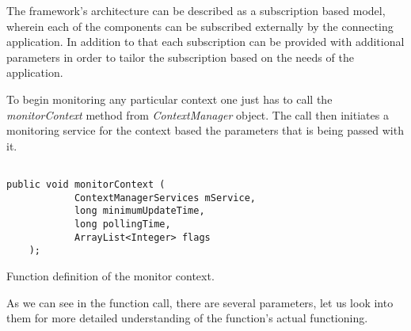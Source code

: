 \documentclass[12pt]{report}
\begin{document}
The framework's architecture can be described as a subscription based model, wherein each of the components can be subscribed externally by the connecting application. In addition to that each subscription can be provided with additional parameters in order to tailor the subscription based on the needs of the application.

To begin monitoring any particular context one just has to call the \textit{monitorContext} method from \textit{ContextManager} object. The call then initiates a monitoring service for the context based the parameters that is being passed with it.

\begin{program}
  \begin{verbatim}

public void monitorContext (
            ContextManagerServices mService,
            long minimumUpdateTime,
            long pollingTime,
            ArrayList<Integer> flags
    );
\end{verbatim}
\label{monitorContextCall}
\caption{Function definition of the monitor context.}
\end{program}

As we can see in the function call, there are several parameters, let us look into them for more detailed understanding of the function's actual functioning.
\end{document}
